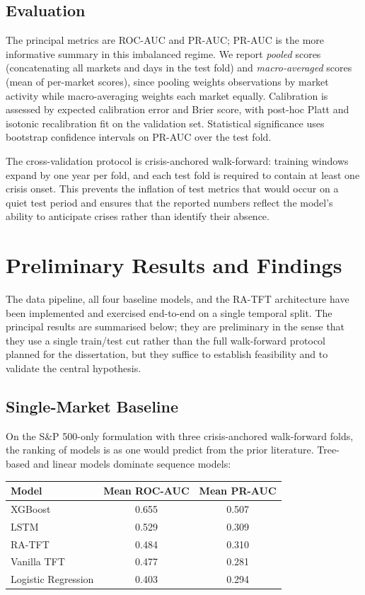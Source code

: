 \documentclass[11pt,a4paper]{article}
\begin{document}
\subsection{Evaluation}
The principal metrics are ROC-AUC and PR-AUC; PR-AUC is the more
informative summary in this imbalanced regime. We report
\emph{pooled} scores (concatenating all markets and days in the test fold)
and \emph{macro-averaged} scores (mean of per-market scores), since pooling
weights observations by market activity while macro-averaging weights each
market equally. Calibration is assessed by expected calibration error and
Brier score, with post-hoc Platt and isotonic recalibration fit on the
validation set. Statistical significance uses bootstrap confidence
intervals on PR-AUC over the test fold.

The cross-validation protocol is crisis-anchored walk-forward: training
windows expand by one year per fold, and each test fold is required to
contain at least one crisis onset. This prevents the inflation of test
metrics that would occur on a quiet test period and ensures that the
reported numbers reflect the model's ability to anticipate crises rather
than identify their absence.

\section{Preliminary Results and Findings}
\label{sec:results}

The data pipeline, all four baseline models, and the RA-TFT architecture
have been implemented and exercised end-to-end on a single temporal split.
The principal results are summarised below; they are preliminary in the
sense that they use a single train/test cut rather than the full
walk-forward protocol planned for the dissertation, but they suffice to
establish feasibility and to validate the central hypothesis.

\subsection{Single-Market Baseline}
On the S\&P 500-only formulation with three crisis-anchored walk-forward
folds, the ranking of models is as one would predict from the prior
literature. Tree-based and linear models dominate sequence models:
\vspace{2pt}
\begin{center}
\small
\begin{tabular}{lcc}
\toprule
Model & Mean ROC-AUC & Mean PR-AUC \\
\midrule
XGBoost            & 0.655 & 0.507 \\
LSTM               & 0.529 & 0.309 \\
RA-TFT             & 0.484 & 0.310 \\
Vanilla TFT        & 0.477 & 0.281 \\
Logistic Regression & 0.403 & 0.294 \\
\bottomrule
\end{tabular}
\end{center}
\end{document}
